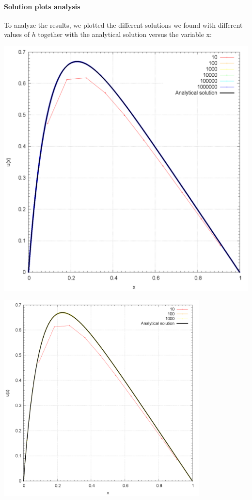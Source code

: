 \documentclass[10pt,a4paper,titlepage]{article}
\begin{document}
\paragraph{Solution plots analysis}
To analyze the results, we plotted the different solutions we found with different values of $h$ together with the analytical solution versus the variable x: \\
\begin{minipage}{0.6\textwidth}
	\includegraphics[width=0.8\columnwidth]{plot.png}
\end{minipage}
\begin{minipage}{0.6\textwidth}
	\includegraphics[width=0.8\textwidth]{plotLU.png}
\end{minipage}\\
\end{document}
